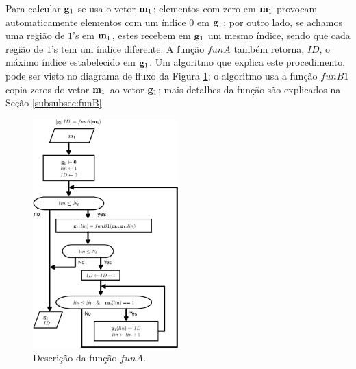 Para calcular $\VECTOR{g}_1$ se usa o vetor $\VECTOR{m}_1$;
elementos com zero em $\VECTOR{m}_1$ provocam automaticamente elementos com um índice $0$ em $\VECTOR{g}_1$;
por outro lado, se achamos uma região de $1$'s em $\VECTOR{m}_1$, 
estes recebem em $\VECTOR{g}_1$ um mesmo índice,
sendo que cada região de $1$'s tem um índice diferente. 
A função $funA$ também retorna, $ID$, o máximo índice estabelecido em $\VECTOR{g}_1$.
Um algoritmo que explica este procedimento, pode ser visto no diagrama de fluxo da Figura \ref{fig:funA0};
o algoritmo usa a função $funB1$ copia zeros do vetor $\VECTOR{m}_1$ ao vetor $\VECTOR{g}_1$;
mais detalhes da função são explicados na Seção \ref{subsubsec:funB}.
\begin{figure}[!htb]
\centering
\includegraphics[width=0.5\textwidth]{section-cumulos/funA0.eps}
\caption{Descrição da função $funA$.}
\label{fig:funA0}
\end{figure}

